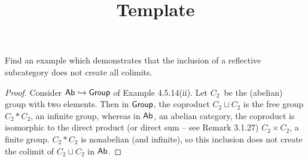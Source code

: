 \documentclass[../../solutions]{subfiles}
\title{Template}
\author{}
\begin{document}
\maketitle

%   

\begin{exercise}
  Find an example which demonstrates that the inclusion of a
  reflective subcategory does not create all colimits.
\end{exercise}

\begin{proof}
  Consider $\mathsf{Ab}\hookrightarrow\mathsf{Group}$ of Example 4.5.14(ii).  Let
  $C_2$~be the (abelian) group with two elements.  Then in $\mathsf{Group}$,
  the coproduct $C_2\sqcup C_2$ is the free group $C_2*C_2$, an
  infinite group, whereas in $\mathsf{Ab}$, an abelian category, the coproduct
  is isomorphic to the direct product (or direct sum -- see Remark
  3.1.27) $C_2\times C_2$, a finite group.  $C_2*C_2$ is nonabelian
  (and infinite), so this inclusion does not create the colimit of
  $C_2\sqcup C_2$ in $\mathsf{Ab}$.
\end{proof}
\end{document}
